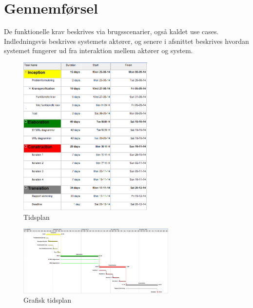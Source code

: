 \chapter{Gennemførsel}

De funktionelle krav beskrives via brugsscenarier, også kaldet use cases. Indledningsvis beskrives systemets aktører, og senere i afsnittet beskrives hvordan systemet fungerer ud fra interaktion mellem aktører og system. \newline


\begin{figure}[H]
\centering
\includegraphics[width=0.6\textwidth]{Billeder/Tidsplan.png}
\caption{Tidsplan}
\label{fig:Tidsplan}
\end{figure}

\newpage

\begin{figure}[V]
\centering
\includegraphics[width=0.7\textwidth]{Billeder/Tidsplan1.png}
\caption{Grafisk tidsplan}
\label{fig:Grafisk_tidsplan}
\end{figure}